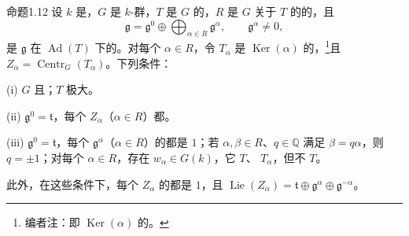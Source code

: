 \begin{SGAresult}{命题}{1.12}
设 $k$ 是，$G$ 是 $k$-群，$T$ 是 $G$ 的，$R$ 是 $G$ 关于 $T$ 的的，且
\[
\mathfrak g=\mathfrak g^0\oplus\bigoplus_{\alpha\in R}\mathfrak g^\alpha,\qquad\mathfrak g^\alpha\ne0,
\]
是 $\mathfrak g$ 在 $\operatorname{Ad}(T)$ 下的。对每个 $\alpha\in R$，令 $T_\alpha$ 是 $\operatorname{Ker}(\alpha)$ 的，\footnote[11]{编者注：即 $\operatorname{Ker}(\alpha)$ 的。}且 $Z_\alpha=\operatorname{Centr}_G(T_\alpha)$。下列条件：

(i) $G$ 且；$T$ 极大。

(ii) $\mathfrak g^0=\mathfrak t$，每个 $Z_\alpha$（$\alpha\in R$）都。

(iii) $\mathfrak g^0=\mathfrak t$，每个 $\mathfrak g^\alpha$（$\alpha\in R$）的都是 $1$；若 $\alpha,\beta\in R$、$q\in\mathbb Q$ 满足 $\beta=q\alpha$，则 $q=\pm1$；对每个 $\alpha\in R$，存在 $w_\alpha\in G(k)$，它 $T$、 $T_\alpha$，但不 $T$。

此外，在这些条件下，每个 $Z_\alpha$ 的都是 $1$，且 $\operatorname{Lie}(Z_\alpha)=\mathfrak t\oplus\mathfrak g^\alpha\oplus\mathfrak g^{-\alpha}$。
\end{SGAresult}
